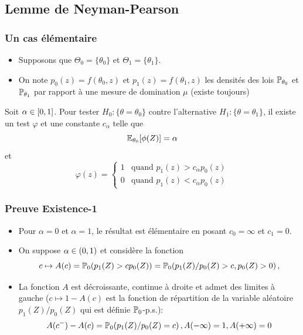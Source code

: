 \subsection{Lemme de Neyman-Pearson}

\begin{frame}
\frametitle{Un cas élémentaire}
\begin{itemize}
\item Supposons que $\Theta_0 = \{\theta_0\}$ et $\Theta_1=\{ \theta_1 \}$.
\item On note $p_0(z)= f(\theta_0,z)$ et $p_1(z)= f(\theta_1,z)$ les densités des lois $\operatorname{{\mathbb P}}_{\theta_0}$ et $\operatorname{{\mathbb P}}_{\theta_1}$ par rapport à une mesure de domination $\mu$ (existe toujours)
\end{itemize}
\begin{theo}
 Soit $\alpha \in \left[0,1\right]$. Pour tester $H_0: \{\theta = \theta_0\}$ contre l'alternative $H_1 : \{\theta = \theta_1\}$, il existe un test $\varphi$ et une constante $c_\alpha$ telle que
$$
\operatorname{{\mathbb E}}_{\theta_0}[\phi(Z)]= \alpha
$$
et
\[
\varphi(z)=
\begin{cases}
1 & \text{quand $p_1(z) > c_\alpha p_0(z)$} \\
0 & \text{quand $p_1(z) < c_\alpha p_0(z)$}
\end{cases}
\]
\end{theo}
\end{frame}

\begin{frame}
\frametitle{Preuve Existence-1}
\begin{itemize}
\item Pour $\alpha=0$ et $\alpha=1$, le résultat est élémentaire en posant $c_0=\infty$ et $c_1=0$.
\item On suppose $\alpha \in \left(0,1\right)$ et considère la fonction  
$$
c \mapsto A(c)= \operatorname{{\mathbb P}}_0( p_1(Z) > c p_0(Z)) = \operatorname{{\mathbb P}}_0( p_1(Z)/p_0(Z) > c , p_0(Z) > 0) \,, 
$$
\item La fonction $A$ est  décroissante, continue à droite et admet des limites à gauche ($c \mapsto 1 - A(c)$ est la fonction de répartition de 
la variable aléatoire $p_1(Z)/p_0(Z)$ qui est définie $\operatorname{{\mathbb P}}_0$-p.s.):  
$$
A(c^-) - A(c) = \operatorname{{\mathbb P}}_0( p_1(Z)/p_0(Z) = c) \,, A(-\infty)= 1, A(+\infty)=0
$$
\end{itemize}
\end{frame}

